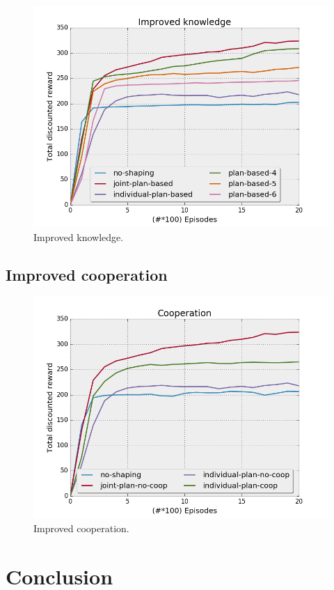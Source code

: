 \documentclass[letterpaper]{article}
\begin{document}
\begin{figure}[h!]
  \includegraphics[width=\linewidth]{img/knowledge.png}
  \caption{Improved knowledge.}
  \label{fig:results2}
\end{figure}

\subsection{Improved cooperation}

\begin{figure}[h!]
  \includegraphics[width=\linewidth]{img/coop.png}
  \caption{Improved cooperation.}
  \label{fig:results3}
\end{figure}

\section{Conclusion}




\footnotesize


\end{document}
